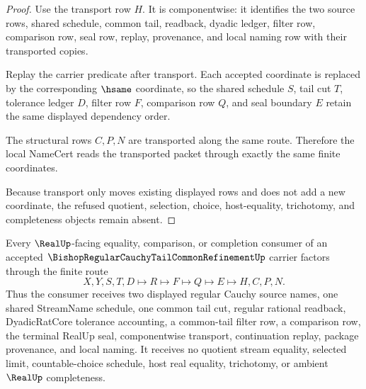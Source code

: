 \begin{proof}
Use the transport row $H$. It is componentwise: it identifies the two source rows, shared schedule, common tail, readback, dyadic ledger, filter row, comparison row, seal row, replay, provenance, and local naming row with their transported copies.

Replay the carrier predicate after transport. Each accepted coordinate is replaced by the corresponding $\hsame$ coordinate, so the shared schedule $S$, tail cut $T$, tolerance ledger $D$, filter row $F$, comparison row $Q$, and seal boundary $E$ retain the same displayed dependency order.

The structural rows $C,P,N$ are transported along the same route. Therefore the local NameCert reads the transported packet through exactly the same finite coordinates.

Because transport only moves existing displayed rows and does not add a new coordinate, the refused quotient, selection, choice, host-equality, trichotomy, and completeness objects remain absent.
\end{proof}

\begin{theorem}
\label{thm:bishop-regular-cauchy-tail-common-refinement-l10-handoff}
Every $\RealUp$-facing equality, comparison, or completion consumer of an accepted $\BishopRegularCauchyTailCommonRefinementUp$ carrier factors through the finite route
$$
X,Y,S,T,D \longmapsto R \longmapsto F \longmapsto Q \longmapsto E \longmapsto H,C,P,N .
$$
Thus the consumer receives two displayed regular Cauchy source names, one shared StreamName schedule, one common tail cut, regular rational readback, DyadicRatCore tolerance accounting, a common-tail filter row, a comparison row, the terminal RealUp seal, componentwise transport, continuation replay, package provenance, and local naming. It receives no quotient stream equality, selected limit, countable-choice schedule, host real equality, trichotomy, or ambient $\RealUp$ completeness.
\end{theorem}

